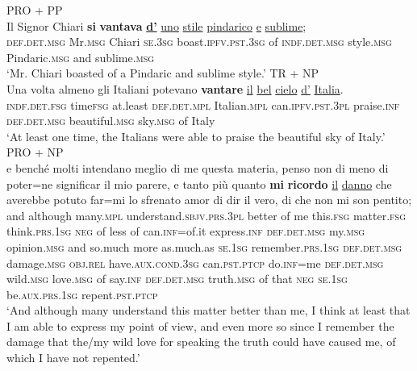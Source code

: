 \documentclass[output=paper,colorlinks,citecolor=brown]{langscibook}
\begin{document}
\begin{exe} %
\ex \label{ex:Disc} \begin{xlist}
    \ex PRO + PP \label{ex:Disc:PRO+PP} \\
    \gll Il Signor Chiari \textbf{si} \textbf{vantava} \ul{\textbf{d'}} \ul{uno} \ul{stile} \ul{pindarico} \ul{e} \ul{sublime};\\
    \textsc{def.det.msg} Mr.\textsc{msg} Chiari \textsc{se}.\textsc{3sg} boast.\textsc{ipfv.pst.3sg} of \textsc{indf.det.msg} style.\textsc{msg} Pindaric.\textsc{msg} and sublime.\textsc{msg}\\ 
    \glt ‘Mr. Chiari boasted of a Pindaric and sublime style.’
    \ex TR + NP \label{ex:Disc:TR+NP} \\
    \gll Una volta almeno gli Italiani potevano \textbf{vantare} \ul{il} \ul{bel} \ul{cielo} \ul{d'} \ul{Italia}.\\
    \textsc{indf.det.fsg} time\textsc{fsg} at.least \textsc{def.det.mpl} Italian.\textsc{mpl} can.\textsc{ipfv.pst.3pl} praise.\textsc{inf} \textsc{def.det.msg} beautiful.\textsc{msg} sky.\textsc{msg} of Italy \\ 
    \glt ‘At least one time, the Italians were able to praise the beautiful sky of Italy.’
    \ex PRO + NP \label{ex:Disc:PRO+NP} \\
    \gll e benché molti intendano meglio di me questa materia, penso non di meno di poter=ne significar il mio parere, e tanto più quanto \textbf{mi} \textbf{ricordo} \ul{il} \ul{danno} che averebbe potuto far=mi lo sfrenato amor di dir il vero, di che non mi son pentito;\\
    and although many.\textsc{mpl} understand.\textsc{sbjv.prs.3pl} better of me this.\textsc{fsg} matter.\textsc{fsg} think.\textsc{prs.1sg} \textsc{neg} of less of can.\textsc{inf}=of.it express.\textsc{inf} \textsc{def.det.msg} my.\textsc{msg} opinion.\textsc{msg} and so.much more as.much.as \textsc{se}.\textsc{1sg} remember.\textsc{prs.1sg} \textsc{def.det.msg} damage.\textsc{msg} \textsc{obj.rel} have.\textsc{aux.cond.3sg} can.\textsc{pst.ptcp} do.\textsc{inf}=me \textsc{def.det.msg} wild.\textsc{msg} love.\textsc{msg} of say.\textsc{inf} \textsc{def.det.msg} truth.\textsc{msg} of that \textsc{neg} \textsc{se}.\textsc{1sg} be.\textsc{aux.prs.1sg} repent.\textsc{pst.ptcp}\\ 
    \newpage
    \glt ‘And although many understand this matter better than me, I think at least that I am able to express my point of view, and even more so since I remember the damage that the/my wild love for speaking the truth could have caused me, of which I have not repented.’
\end{xlist}
\end{exe}
\end{document}
